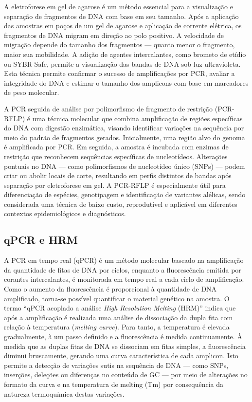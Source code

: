 A eletroforese em gel de agarose é um método essencial para a visualização e separação de fragmentos de DNA com base em seu tamanho. 
Após a aplicação das amostras em poços de um gel de agarose e aplicação de corrente elétrica, os fragmentos de DNA migram em direção 
ao polo positivo. A velocidade de migração depende do tamanho dos fragmentos — quanto menor o fragmento, maior sua mobilidade. 
A adição de agentes intercalantes, como brometo de etídio ou SYBR Safe, permite a visualização das bandas de DNA sob luz ultravioleta. 
Esta técnica permite confirmar o sucesso de amplificações por PCR, avaliar a integridade do DNA e estimar o tamanho dos amplicons 
com base em marcadores de peso molecular\cite{costa1998leishmaniose}.

A PCR seguida de análise por polimorfismo de fragmento de restrição (PCR-RFLP) é uma técnica molecular que combina amplificação de regiões 
específicas do DNA com digestão enzimática, visando identificar variações na sequência por meio do padrão de fragmentos gerados. Inicialmente, 
uma região alvo do genoma é amplificada por PCR. Em seguida, a amostra é incubada com enzimas de restrição que reconhecem sequências específicas 
de nucleotídeos. Alterações pontuais no DNA — como polimorfismos de nucleotídeo
único (SNPs) — podem criar ou abolir locais de corte, resultando em perfis distintos de bandas após separação 
por eletroforese em gel. A PCR-RFLP é especialmente útil para diferenciação de espécies, genotipagem e identificação de variantes alélicas, sendo 
considerada uma técnica de baixo custo, reprodutível e aplicável em diferentes
contextos epidemiológicos e diagnósticos\cite{garcia2005metodos}.

\subsection{qPCR e HRM}
A PCR em tempo real (qPCR)  é um método molecular baseado na amplificação da
quantidade de fitas de DNA por ciclos, enquanto a fluorescência emitida por
corantes intercalantes, é monitorada em tempo real a cada ciclo de amplificação.
Como o aumento da fluorescência é proporcional à quantidade de DNA amplificado,
torna-se possível quantificar o material genético na amostra\cite{Galluzi2018}.
O termo ``qPCR acoplado a análise \textit{High Resolution Melting} (HRM)'' indica que
após a amplificação é realizada uma análise de dissociação da dupla fita com
relação à temperatura (\textit{melting curve}). Para tanto, a temperatura é
elevada gradualmente, à um passo definido e a fluorescência é medida
continuamente. À medida que as duplas fitas de DNA se dissociam em fitas
simples, a fluorescência diminui bruscamente, gerando uma curva característica
de cada amplicon. Isto permite a detecção de variações sutis na sequência de DNA
— como SNPs, inserções, deleções ou
diferenças no conteúdo de GC — por meio de alterações no formato da curva e na
temperatura de melting (Tm)\cite{Wittwer2009} por consequência da natureza
termoquímica destas variações.

